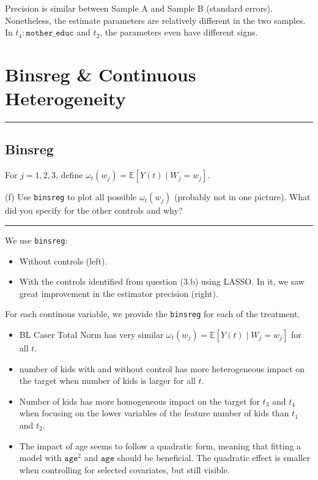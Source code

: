 \documentclass{article}
\newenvironment{colorparagraph}[1]{\par\color{#1}}{\par}
\begin{document}
Precision is similar between Sample A and Sample B (standard errors). Nonetheless, the estimate parameters are relatively different in the two samples. In $t_4:\texttt{mother\_educ}$ and $t_2$, the parameters even have different signs.

\begin{colorparagraph}{questioncolor}

\section*{Binsreg \& Continuous Heterogeneity}
\label{q3f}
\rule{\textwidth}{0.5pt}
\subsection{Binsreg}
For \( j = 1, 2, 3 \), define \( \omega_t(w_j) = \mathbb{E}[Y(t) \mid W_j = w_j] \).

(f) Use \texttt{binsreg} to plot all possible \( \omega_t(w_j) \) (probably not in one picture). What did you specify for the other controls and why?

\rule{\textwidth}{0.5pt}
\end{colorparagraph}

We use \texttt{binsreg}:
\begin{itemize}
  \item Without controls (left).
  \item With the controls identified from question (3.b) using LASSO. In it, we saw great improvement in the estimator precision (right).
\end{itemize}

For each continous variable, we provide the \texttt{binsreg} for each of the treatment.

\begin{itemize}
  \item BL Caser Total Norm has very similar \( \omega_t(w_j) = \mathbb{E}[Y(t) \mid W_j = w_j] \) for all $t$.
  \item number of kids with and without control has more heterogeneous impact on the target when number of kids is larger for all $t$.
  \item Number of kids has more homogeneous impact on the target for $t_3$ and $t_4$ when focusing on the lower variables of the feature number of kids than $t_1$ and $t_2$.
  \item The impact of age seems to follow a quadratic form, meaning that fitting a model with $\texttt{age}^2$ and $\texttt{age}$ should be beneficial. The quadratic effect is smaller when controlling for selected covariates, but still visible.
\end{itemize}
\end{document}

